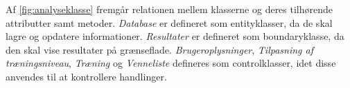 \noindent
Af \autoref{fig:analyseklasse} fremgår relationen mellem klasserne og deres tilhørende attributter samt metoder.  \textit{Database} er defineret som entityklasser, da de skal lagre og opdatere informationer. \textit{Resultater} er defineret som boundaryklasse, da den skal vise resultater på grænseflade.  \textit{Brugeroplysninger}, \textit{Tilpasning af træningsniveau}, \textit{Træning} og \textit{Venneliste} defineres som controlklasser, idet disse anvendes til at kontrollere handlinger. 

